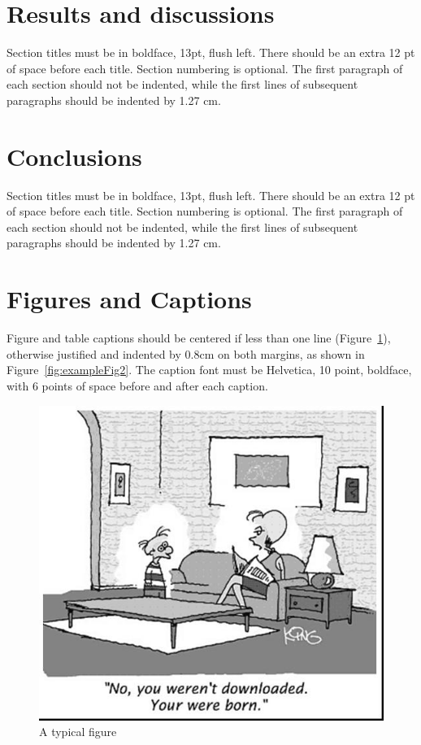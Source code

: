 \documentclass[12pt]{article}
\begin{document}
\section{Results and discussions}

Section titles must be in boldface, 13pt, flush left. There should be an extra
12 pt of space before each title. Section numbering is optional. The first
paragraph of each section should not be indented, while the first lines of
subsequent paragraphs should be indented by 1.27 cm.

\section{Conclusions}

Section titles must be in boldface, 13pt, flush left. There should be an extra
12 pt of space before each title. Section numbering is optional. The first
paragraph of each section should not be indented, while the first lines of
subsequent paragraphs should be indented by 1.27 cm.

\section{Figures and Captions}\label{sec:figs}


Figure and table captions should be centered if less than one line
(Figure~\ref{fig:exampleFig1}), otherwise justified and indented by 0.8cm on
both margins, as shown in Figure~\ref{fig:exampleFig2}. The caption font must
be Helvetica, 10 point, boldface, with 6 points of space before and after each
caption.

\begin{figure}[ht]
\centering
\includegraphics[width=.5\textwidth]{fig1.jpg}
\caption{A typical figure}
\label{fig:exampleFig1}
\end{figure}
\end{document}

